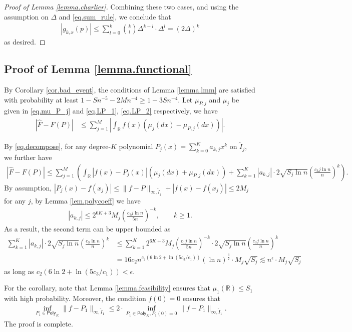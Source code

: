 \documentclass[final,12pt]{colt2018} %
\newcommand{\reals}{\mathbb{R}}
\begin{document}
\begin{proof}[Proof of Lemma \ref{lemma.charlier}]
	Combining these two cases, and using the assumption on $\Delta$ and \eqref{eq.sum_rule}, we conclude that
	\begin{align*}
	|g_{k,x}(p)| \le \sum_{l=0}^k \binom{k}{l}\Delta^{k-l}\cdot \Delta^l = (2\Delta)^k
	\end{align*}
	as desired.
\end{proof}

\subsection{Proof of Lemma \ref{lemma.functional}}
By Corollary \ref{cor.bad_event}, the conditions of Lemma \ref{lemma.lmm} are satisfied with probability at least $1-Sn^{-5}-2Mn^{-4}\ge 1-3Sn^{-4}$. Let $\mu_{P,j}$ and $\mu_j$ be given in \eqref{eq.mu_P_j} and \eqref{eq.LP_1}, \eqref{eq.LP_2} respectively, we have
\begin{align*}
|\hat{F} - F(P)| &\le \sum_{j=1}^M \left|\int_{\reals} f(x)(\mu_j(dx)-\mu_{P,j}(dx))\right|.
\end{align*}

By \eqref{eq.decompose}, for any degree-$K$ polynomial $P_j(x)=\sum_{k=0}^K a_{k,j}x^k$ on $\tilde{I}_j$, we further have
\begin{align*}
|\hat{F} - F(P)| \le \sum_{j=1}^M \left(\int_\reals |f(x)-P_j(x)|(\mu_j(dx)+\mu_{P,j}(dx)) + \sum_{k=1}^K |a_{k,j}|\cdot 2\sqrt{S_j\ln n}\left(\frac{c_3j\ln n}{n}\right)^k\right).
\end{align*}
By assumption, $|P_j(x)-f(x_j)|\le \|f-P\|_{\infty, \tilde{I}_j} + |f(x)-f(x_j)|\le 2M_j$ for any $j$, by Lemma \ref{lem.polycoeff} we have
\begin{align*}
|a_{k,j}| \le 2^{6K+3}M_j\left(\frac{c_1j\ln n}{5n}\right)^{-k}, \qquad k\ge 1.
\end{align*}
As a result, the second term can be upper bounded as
\begin{align*}
\sum_{k=1}^K |a_{k,j}|\cdot 2\sqrt{S_j\ln n}\left(\frac{c_3\ln n}{n}\right)^k &\le \sum_{k=1}^K 2^{6K+3}M_j\left(\frac{c_1j\ln n}{5n}\right)^{-k}\cdot 2\sqrt{S_j\ln n}\left(\frac{c_3j\ln n}{n}\right)^k \\
&= 16c_2n^{c_2(6\ln 2+\ln (5c_3/c_1))}(\ln n)^{\frac{3}{2}}\cdot M_j\sqrt{S_j} \lesssim n^{\epsilon}\cdot M_j\sqrt{S_j}
\end{align*}
as long as $c_2(6\ln 2+\ln(5c_3/c_1))<\epsilon$.  

For the corollary, note that Lemma \ref{lemma.feasibility} ensures that $\mu_1(\reals)\le S_1$ with high probability. Moreover, the condition $f(0)=0$ ensures that 
\begin{align*}
\inf_{P_1\in\mathsf{Poly}_K} \|f-P_1\|_{\infty,\tilde{I}_1} \le 2\cdot \inf_{P_1\in\mathsf{Poly}_K, P_1(0)=0} \|f-P_1\|_{\infty,\tilde{I}_1}.
\end{align*}
The proof is complete.
\end{document}
